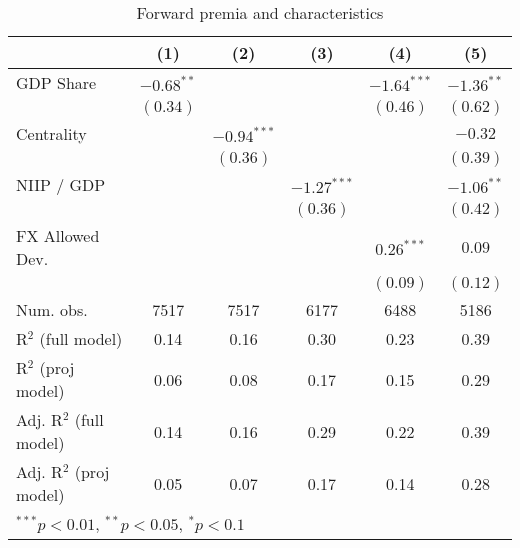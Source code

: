 
\begin{table}
\begin{center}
\begin{tabular}{l c c c c c }
\hline
 & (1) & (2) & (3) & (4) & (5) \\
\hline
GDP Share               & $-0.68^{**}$ &               &               & $-1.64^{***}$ & $-1.36^{**}$ \\
                        & $(0.34)$     &               &               & $(0.46)$      & $(0.62)$     \\
Centrality              &              & $-0.94^{***}$ &               &               & $-0.32$      \\
                        &              & $(0.36)$      &               &               & $(0.39)$     \\
NIIP / GDP              &              &               & $-1.27^{***}$ &               & $-1.06^{**}$ \\
                        &              &               & $(0.36)$      &               & $(0.42)$     \\
FX Allowed Dev.         &              &               &               & $0.26^{***}$  & $0.09$       \\
                        &              &               &               & $(0.09)$      & $(0.12)$     \\
\hline
Num. obs.               & 7517         & 7517          & 6177          & 6488          & 5186         \\
R$^2$ (full model)      & 0.14         & 0.16          & 0.30          & 0.23          & 0.39         \\
R$^2$ (proj model)      & 0.06         & 0.08          & 0.17          & 0.15          & 0.29         \\
Adj. R$^2$ (full model) & 0.14         & 0.16          & 0.29          & 0.22          & 0.39         \\
Adj. R$^2$ (proj model) & 0.05         & 0.07          & 0.17          & 0.14          & 0.28         \\
\hline
\multicolumn{6}{l}{\scriptsize{$^{***}p<0.01$, $^{**}p<0.05$, $^*p<0.1$}}
\end{tabular}
\caption{Forward premia and characteristics}
\label{table:fp_char}
\end{center}
\end{table}
